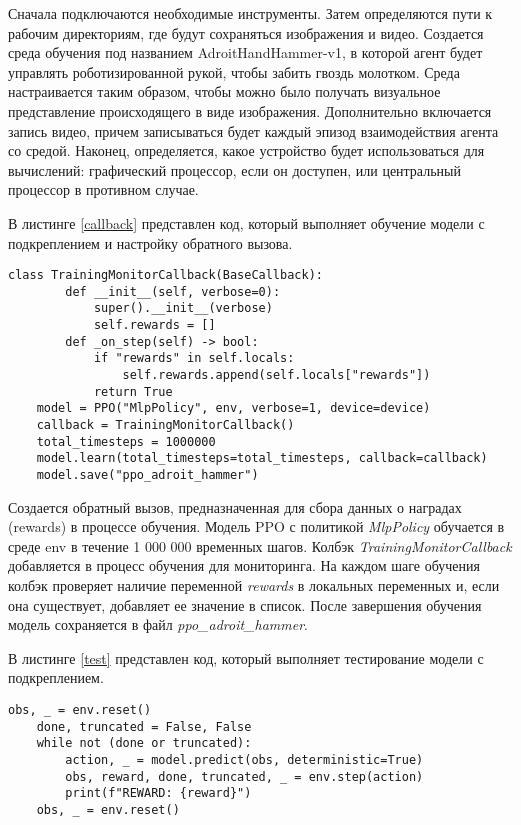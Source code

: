 Сначала подключаются необходимые инструменты.
Затем определяются пути к рабочим директориям, где будут сохраняться изображения и видео. 
Создается среда обучения под названием AdroitHandHammer-v1, 
в которой агент будет управлять роботизированной рукой, чтобы забить гвоздь молотком. 
Среда настраивается таким образом, чтобы можно было получать визуальное представление происходящего в виде изображения.
Дополнительно включается запись видео, причем записываться будет каждый эпизод взаимодействия агента со средой.
Наконец, определяется, какое устройство будет использоваться для вычислений: графический процессор, если он доступен, или центральный процессор в противном случае.

В листинге \ref{callback} представлен код, который выполняет обучение модели с подкреплением и настройку обратного вызова.
\begin{lstlisting}[label=callback, caption={Обучение модели и настройки колбэка}]
    class TrainingMonitorCallback(BaseCallback):
        def __init__(self, verbose=0):
            super().__init__(verbose)
            self.rewards = []
        def _on_step(self) -> bool:
            if "rewards" in self.locals:
                self.rewards.append(self.locals["rewards"])
            return True
    model = PPO("MlpPolicy", env, verbose=1, device=device)
    callback = TrainingMonitorCallback()
    total_timesteps = 1000000
    model.learn(total_timesteps=total_timesteps, callback=callback)
    model.save("ppo_adroit_hammer")
\end{lstlisting}

Создается обратный вызов, предназначенная для сбора данных о наградах (rewards) в процессе обучения.
Модель PPO с политикой \textit{MlpPolicy} обучается в среде env в течение 1 000 000 временных шагов. 
Колбэк \textit{TrainingMonitorCallback} добавляется в процесс обучения для мониторинга.
На каждом шаге обучения колбэк проверяет наличие переменной \textit{rewards} в локальных переменных и, 
если она существует, добавляет ее значение в список.
После завершения обучения модель сохраняется в файл \textit{ppo\_adroit\_hammer}. 

В листинге \ref{test} представлен код, который выполняет тестирование модели с подкреплением.
\begin{lstlisting}[label=test, caption={Тестирование}]
    obs, _ = env.reset()
    done, truncated = False, False
    while not (done or truncated):
        action, _ = model.predict(obs, deterministic=True)
        obs, reward, done, truncated, _ = env.step(action)
        print(f"REWARD: {reward}")
    obs, _ = env.reset()
\end{lstlisting}

